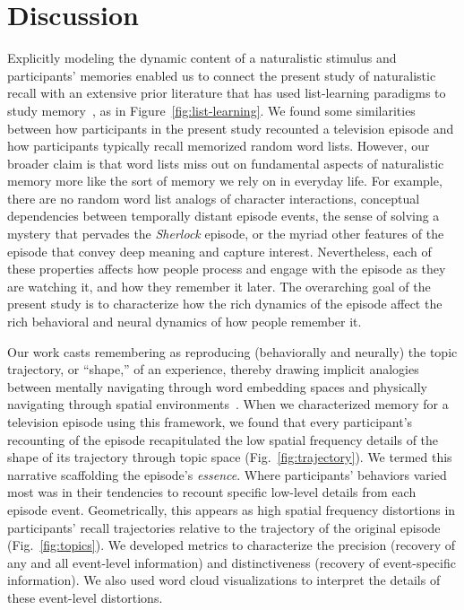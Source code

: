 \documentclass[10pt]{article}
\begin{document}
\section*{Discussion}
\label{sec:discussion}

Explicitly modeling the dynamic content of a naturalistic stimulus and participants' memories enabled us to connect the present study of naturalistic recall with an extensive prior literature that has used list-learning paradigms to study memory~\citep[for review see][]{Kaha12}, as in Figure~\ref{fig:list-learning}.  We found some similarities between how participants in the present study recounted a television episode and how participants typically recall memorized random word lists.  However, our broader claim is that word lists miss out on fundamental aspects of naturalistic memory more like the sort of memory we rely on in everyday life.  For example, there are no random word list analogs of character interactions, conceptual dependencies between temporally distant episode events, the sense of solving a mystery that pervades the \textit{Sherlock} episode, or the myriad other features of the episode that convey deep meaning and capture interest.  Nevertheless, each of these properties affects how people process and engage with the episode as they are watching it, and how they remember it later.  The overarching goal of the present study is to characterize how the rich dynamics of the episode affect the rich behavioral and neural dynamics of how people remember it.

Our work casts remembering as reproducing (behaviorally and neurally) the topic trajectory, or ``shape,'' of an experience, thereby drawing implicit analogies between mentally navigating through word embedding spaces and physically navigating through spatial environments~\citep[e.g.,][]{BellEtal18, BellEtal20, ConsEtal16}.  When we characterized memory for a television episode using this framework, we found that every participant's recounting of the episode recapitulated the low spatial frequency details of the shape of its trajectory through topic space (Fig.~\ref{fig:trajectory}).  We termed this narrative scaffolding the episode's \textit{essence}.  Where participants' behaviors varied most was in their tendencies to recount specific low-level details from each episode event.  Geometrically, this appears as high spatial frequency distortions in participants' recall trajectories relative to the trajectory of the original episode (Fig.~\ref{fig:topics}).  We developed metrics to characterize the precision (recovery of any and all event-level information) and distinctiveness (recovery of event-specific information).  We also used word cloud visualizations to interpret the details of these event-level distortions.
\end{document}
